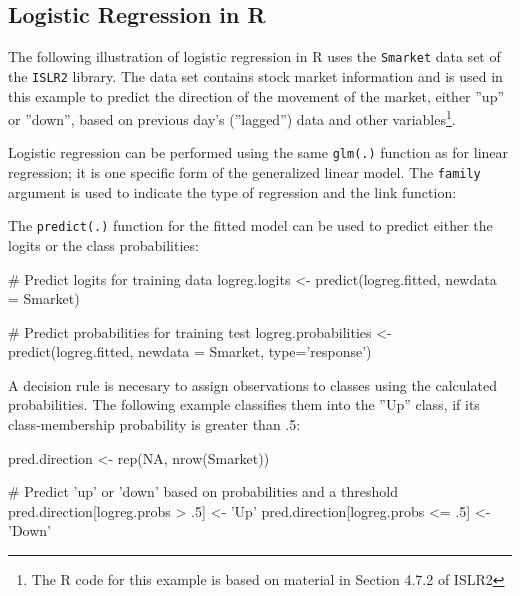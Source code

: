 \begin{withcode}
\subsection{Logistic Regression in R}

The following illustration of logistic regression in R uses the \texttt{Smarket} data set of the \texttt{ISLR2} library. The data set contains stock market information and is used in this example to predict the direction of the movement of the market, either ''up'' or ''down'', based on previous day's (''lagged'') data and other variables\footnote{The R code for this example is based on material in Section 4.7.2 of ISLR2}. 

Logistic regression can be performed using the same \texttt{glm(.)} function as for linear regression; it is one specific form of the generalized linear model. The \texttt{family} argument is used to indicate the type of regression and the link function:


The \texttt{predict(.)} function for the fitted model can be used to predict either the logits or the class probabilities:

\begin{Rcode}
# Predict logits for training data
logreg.logits <- predict(logreg.fitted, newdata = Smarket)

# Predict probabilities for training test
logreg.probabilities <- predict(logreg.fitted, newdata = Smarket, 
                                   type='response')
\end{Rcode}

A decision rule is necesary to assign observations to classes using the calculated probabilities. The following example classifies them into the ''Up'' class, if its class-membership probability is greater than .5:

\begin{Rcode}
pred.direction <- rep(NA, nrow(Smarket))

# Predict 'up' or 'down' based on probabilities and a threshold
pred.direction[logreg.probs >  .5] <- 'Up'
pred.direction[logreg.probs <= .5] <- 'Down'
\end{Rcode}


\end{withcode}
